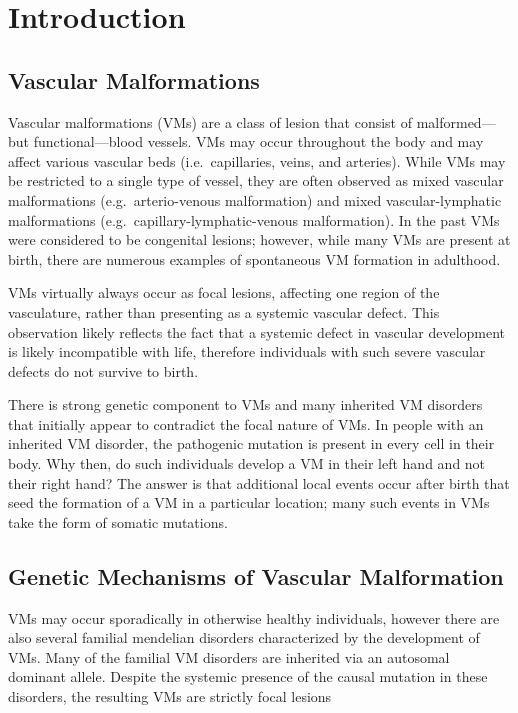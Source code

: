 \chapter{Introduction}
\label{chap:intro}

\clearpage

\section{Vascular Malformations}
Vascular malformations (VMs) are a class of lesion that consist of malformed---but functional---blood vessels. VMs may occur throughout the body and may affect various vascular beds (i.e.~capillaries, veins, and arteries). While VMs may be restricted to a single type of vessel, they are often observed as mixed vascular malformations (e.g.~arterio-venous malformation) and mixed vascular-lymphatic malformations (e.g.~capillary-lymphatic-venous malformation). In the past VMs were considered to be congenital lesions; however, while many VMs are present at birth, there are numerous examples of spontaneous  VM formation in adulthood. 

VMs virtually always occur as focal lesions, affecting one region of the vasculature, rather than presenting as a systemic vascular defect. This observation likely reflects the fact that a systemic defect in vascular development is likely incompatible with life, therefore individuals with such severe vascular defects do not survive to birth. 

There is strong genetic component to VMs and many inherited VM disorders that initially appear to contradict the focal nature of VMs. In people with an inherited VM disorder, the pathogenic mutation is present in every cell in their body. Why then, do such individuals develop a VM in their left hand and not their right hand? The answer is that additional local events occur after birth that seed the formation of a VM in a particular location; many such events in VMs take the form of somatic mutations. 

\section{Genetic Mechanisms of Vascular Malformation}
VMs may occur sporadically in otherwise healthy individuals, however there are also several familial mendelian disorders characterized by the development of VMs. Many of the familial VM disorders are inherited via an autosomal dominant allele. Despite the systemic presence of the causal mutation in these disorders, the resulting VMs are strictly focal lesions